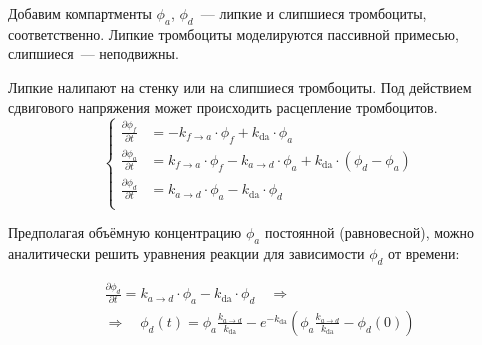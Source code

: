 \documentclass[
    14pt,
    xcolor=dvipsnames,
    aspectratio=169
]{beamer}
\begin{document}
\begin{frame}{\subsecname}
    Добавим компартменты $ \phi_a $, $ \phi_d $~--- липкие и слипшиеся тромбоциты,
    соответственно. Липкие тромбоциты моделируются пассивной примесью, слипшиеся~--- неподвижны.

    Липкие налипают на стенку или на слипшиеся тромбоциты.
    Под действием сдвигового напряжения может происходить расцепление тромбоцитов.
    \[
        \begin{cases}
            \frac{\partial \phi_f}{\partial t} &= -k_{f \to a} \cdot \phi_f + k_{\mathrm{da}} \cdot \phi_a \\
            \frac{\partial \phi_a}{\partial t} &=  k_{f \to a} \cdot \phi_f - k_{a \to d} \cdot \phi_a + k_{\mathrm{da}} \cdot (\phi_d - \phi_a) \\
            \frac{\partial \phi_d}{\partial t} &=  k_{a \to d} \cdot \phi_a - k_{\mathrm{da}} \cdot \phi_d \\
        \end{cases}
    \]
\end{frame}

\begin{frame}{\subsecname}
    Предполагая объёмную концентрацию $ \phi_a $ постоянной (равновесной),
    можно аналитически решить уравнения реакции для зависимости $ \phi_d $ от времени:

    \begin{multline*}
        \frac{\partial \phi_d}{\partial t} = k_{a \to d} \cdot \phi_a - k_{\mathrm{da}} \cdot \phi_d
        \quad \Longrightarrow \\ \Longrightarrow \quad \phi_d(t) = \phi_a \frac{k_{a \to d}}{k_\mathrm{da}} - e^{-k_{\mathrm{da}}} \left( \phi_a \frac{k_{a \to d}}{k_\mathrm{da}} - \phi_d(0) \right)
    \end{multline*}
\end{frame}
\end{document}
